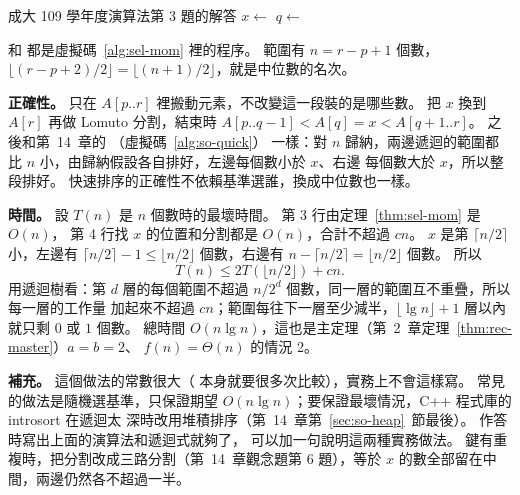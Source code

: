 \begin{pseudo}{成大 109 學年度演算法第 3 題的解答}
        \State $x \gets$  
        \State $q \gets$ 
        \State {}
        \State {}
    \EndIf
\EndProcedure
\end{pseudo}

 和  都是虛擬碼~\ref{alg:sel-mom} 裡的程序。 範圍有
$n = r - p + 1$ 個數，$\lfloor (r - p + 2)/2 \rfloor = \lfloor (n+1)/2 \rfloor$，就是中位數的名次。

\textbf{正確性。}  只在 $A[p..r]$ 裡搬動元素，不改變這一段裝的是哪些數。
 把 $x$ 換到 $A[r]$ 再做 Lomuto 分割，結束時
$A[p..q-1] < A[q] = x < A[q+1..r]$。 之後和第~14~章的 （虛擬碼~\ref{alg:so-quick}）
一樣：對 $n$ 歸納，兩邊遞迴的範圍都比 $n$ 小，由歸納假設各自排好，左邊每個數小於 $x$、右邊
每個數大於 $x$，所以整段排好。 快速排序的正確性不依賴基準選誰，換成中位數也一樣。

\textbf{時間。} 設 $T(n)$ 是 $n$ 個數時的最壞時間。 第 3 行由定理~\ref{thm:sel-mom} 是 $O(n)$，
第 4 行找 $x$ 的位置和分割都是 $O(n)$，合計不超過 $cn$。 $x$ 是第 $\lceil n/2 \rceil$ 小，左邊有
$\lceil n/2 \rceil - 1 \le \lfloor n/2 \rfloor$ 個數，右邊有 $n - \lceil n/2 \rceil = \lfloor n/2
\rfloor$ 個數。 所以
\[
T(n) \le 2T(\lfloor n/2 \rfloor) + cn .
\]
用遞迴樹看：第 $d$ 層的每個範圍不超過 $n/2^d$ 個數，同一層的範圍互不重疊，所以每一層的工作量
加起來不超過 $cn$；範圍每往下一層至少減半，$\lfloor \lg n \rfloor + 1$ 層以內就只剩 $0$ 或 $1$
個數。 總時間 $O(n \lg n)$，這也是主定理（第~2~章定理~\ref{thm:rec-master}）$a = b = 2$、
$f(n) = \Theta(n)$ 的情況 2。

\textbf{補充。} 這個做法的常數很大（ 本身就要很多次比較），實務上不會這樣寫。 常見
的做法是隨機選基準，只保證期望 $O(n \lg n)$；要保證最壞情況，C++ 程式庫的 introsort 在遞迴太
深時改用堆積排序（第~14~章第~\ref{sec:so-heap}~節最後）。 作答時寫出上面的演算法和遞迴式就夠了，
可以加一句說明這兩種實務做法。 鍵有重複時，把分割改成三路分割（第~14~章觀念題第 6 題），等於
$x$ 的數全部留在中間，兩邊仍然各不超過一半。
